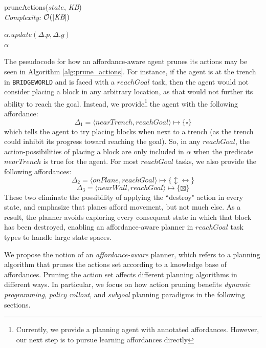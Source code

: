 \documentclass[]{article}
\begin{document}
\begin{algorithm}
  \caption{pruneActions($state$, {\it KB}) \\ {\it Complexity:} $\mathcal{O}(|\text{{\it KB}}|)$}
  \begin{algorithmic}[1]
    \State $\alpha.update(\Delta.p, \Delta.g)$
    \EndIf
    \EndFor \\
    \Return $\alpha$
  \end{algorithmic}
  \label{alg:prune_actions}
\end{algorithm}


The pseudocode for how an affordance-aware agent prunes its actions
may be seen in Algorithm \ref{alg:prune_actions}. For instance, if the
agent is at the trench in \texttt{BRIDGEWORLD} and is faced with a
$reachGoal$ task, then the agent would not consider placing a block in
any arbitrary location, as that would not further its ability to reach
the goal. Instead, we provide\footnote{Currently, we provide a
  planning agent with annotated affordances. However, our next step is
  to pursue learning affordances directly} the agent with the
following affordance: 
\[
\Delta_1 = \langle nearTrench, reachGoal \rangle \longmapsto \{\square\}
\]
which tells the agent to try
placing blocks when next to a trench (as the trench could inhibit its
progress toward reaching the goal). So, in any $reachGoal$, the
action-possibilities of placing a block are only included in $\alpha$
when the predicate $nearTrench$ is true for the agent. For most
$reachGoal$ tasks, we also provide the following affordances:
\[
\Delta_2 = \langle onPlane, reachGoal \rangle \longmapsto
\{\updownarrow \leftrightarrow\}
\]
\[
\Delta_3 = \langle nearWall,
reachGoal \rangle \longmapsto \{\boxtimes \}
\]
These two eliminate
the possibility of applying the ``destroy" action in every state, and emphasize that
planes afford movement, but not much else.  As a result, the planner avoids exploring every consequent state in which
that block has been destroyed, enabling an affordance-aware planner in
$reachGoal$ task types to handle large state spaces.


We propose the notion of an {\it affordance-aware} planner, which
refers to a planning algorithm that prunes the actions set according
to a knowledge base of affordances. Pruning the action set affects
different planning algorithms in different ways. In particular, we
focus on how action pruning benefits {\em dynamic programming}, {\em
  policy rollout}, and {\em subgoal} planning paradigms in the
following sections.
\end{document}
